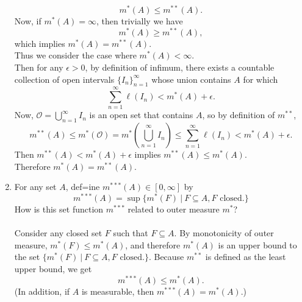 \begin{enumerate}
	\[
		m^*(A)\le m^{**}(A).
	\]
	Now, if $m^*(A)=\infty$, then trivially we have
	\[
		m^*(A)\ge m^{**}(A),
	\]
	which implies $m^*(A)= m^{**}(A)$.\\
	Thus we consider the case where $m^*(A)<\infty$.\\
	Then for any $\epsilon>0$, by definition of infimum, there exists a countable collection of open intervals $\{I_n\}_{n=1}^\infty$ whose union contains $A$ for which 
	\[
		\sum_{n=1}^\infty \ell(I_n) <m^*(A)+\epsilon.
	\]
	Now, $\mathcal{O}=\bigcup_{n=1}^\infty I_n$ is an open set that contains $A$, so by definition of $m^{**}$,
	\[
		m^{**}(A)\le m^*(\mathcal{O})=m^*(\bigcup_{n=1}^\infty I_n)\le\sum_{n=1}^\infty \ell(I_n) <m^*(A)+\epsilon.
	\]
	Then $m^{**}(A)<m^*(A)+\epsilon$ implies $m^{**}(A)\le m^*(A)$.\\
	Therefore $m^*(A)= m^{**}(A)$.
	\item For any set $A$, def=ine $m^{***}(A)\in[0,\infty]$ by
	\[
		m^{***}(A)=\sup\{m^*(F)\ |\ F\subseteq A, F\text{ closed.}\}	
	\]
	How is this set function $m^{***}$ related to outer measure $m^*$?\\
	\\Consider any closed set $F$ such that $F\subseteq A$.
	By monotonicity of outer measure, $m^*(F)\le m^*(A)$, and therefore $m^*(A)$ is an upper bound to the set $\{m^*(F)\ |\ F\subseteq A, F\text{ closed.}\}$.
	Because $m^{**}$ is defined as the least upper bound, we get
	\[
		m^{***}(A)\le m^*(A).
	\]
	(In addition, if $A$ is measurable, then $m^{***}(A)= m^*(A)$.)
\end{enumerate}

